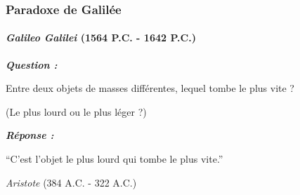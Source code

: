 \documentclass[usenames, dvipsnames]{beamer}
\begin{document}
\begin{frame}[plain]
\frametitle{Paradoxe de Galilée}
\framesubtitle{\textit{Galileo Galilei} (1564 P.C. - 1642 P.C.)}

\textit{\textbf{Question :}}

Entre deux objets de masses différentes, lequel tombe le plus vite ?

(Le plus lourd ou le plus léger ?)

\vspace{1cm}
\textit{\textbf{Réponse :}}

``C'est l'objet le plus lourd qui tombe le plus vite.''

\textit{Aristote} (384 A.C. - 322 A.C.)


\end{frame}
\end{document}
